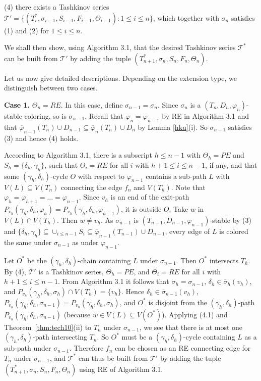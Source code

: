 \documentclass[11pt]{article}
\newcommand{\TT}{\mathcal {T}}
\newcommand{\phibar}{\overline{\varphi}}
\begin{document}
(4) there exists a Tashkinov series $\TT'=\{(T_i^*, \sigma_{i-1}, S_{i-1}, F_{i-1}, \Theta_{i-1}): 1\le i \le n\}$, which together with $\sigma_n$ satisfies 
(1) and (2) for $1\le i \le n$.

We shall then show, using Algorithm 3.1, that the desired Tashkinov series $\TT^*$ can be built from $\TT'$ by adding the tuple $(T^*_{n+1}, \sigma_{n}, S_{n}, F_{n}, \Theta_{n})$. 

Let us now give detailed descriptions. Depending on the extension type, we distinguish between two cases.

{\bf Case 1.} $\Theta_n=RE$. In this case, define $\sigma_{n-1}=\sigma_n$. Since $\sigma_n$ is a $(T_n,D_n,\varphi_n)$-stable coloring, so is $\sigma_{n-1}$. 
Recall that $\varphi_n=\varphi_{n-1}$ by RE in Algorithm 3.1 and that $\phibar_{n-1}(T_n)\cup D_{n-1}\subseteq \phibar_{n}(T_n)\cup D_n$ by Lemma \ref{hku}(i).
So $\sigma_{n-1}$ satisfies (3) and hence (4) holds.

According to Algorithm 3.1, there is a subscript $h \le n-1$ with $\Theta_h=PE$ and $S_h=\{\delta_h, \gamma_h\}$, such that $\Theta_i=RE$ for all $i$ 
with $h+1\le i \le n-1$, if any, and that some $(\gamma_h,\delta_h)$-cycle $O$ with respect to $\varphi_{n-1}$ contains a sub-path $L$ 
with $V(L)\subseteq V(T_n)$ connecting the edge $f_n$ and $V(T_h)$. Note that $\varphi_h=\varphi_{h+1}= \ldots =\varphi_{n-1}$.  
Since $v_h$ is an end of the exit-path $P_{v_h}(\gamma_h,\delta_h,\varphi_h)=P_{v_h}(\gamma_h,\delta_h,
\varphi_{n-1})$, it is outside $O$. Take $w$ in $V(L)\cap V(T_h)$. Then $w\neq v_h$.
As $\sigma_{n-1}$ is $(T_{n-1},D_{n-1},\varphi_{n-1})$-stable by (3) and $\{\delta_h,\gamma_h\} \subseteq \cup_{i \le n-1} S_i \subseteq
\phibar_{n-1}(T_{n-1})\cup D_{n-1}$, every edge of $L$ is colored the same under $\sigma_{n-1}$ as under $\varphi_{n-1}$. 

Let $O^*$ be the $(\gamma_h,\delta_h)$-chain containing $L$ under $\sigma_{n-1}$. Then $O^*$ intersects $T_h$. By (4), $\TT'$ is a 
Tashkinov series, $\Theta_h=PE$, and $\Theta_i=RE$ for all $i$ with $h+1\le i \le n-1$. From Algorithm 3.1 it follows that 
$\sigma_h=\sigma_{n-1}$, $\delta_h\in\overline{\sigma}_h(v_h)$, and $P_{v_h}(\gamma_h,\delta_h,\sigma_h)\cap V(T_h)=\{v_h\}$.
Hence $\delta_h\in\overline{\sigma}_{n-1}(v_h)$, $P_{v_h}(\gamma_h,\delta_h,\sigma_{n-1})=P_{v_h}(\gamma_h,\delta_h,\sigma_h)$,
and $O^*$ is disjoint from the $(\gamma_h,\delta_h)$-path $P_{v_h}(\gamma_h,\delta_h,\sigma_{n-1})$ (because $w\in V(L)\subseteq V(O^*)$). Applying (4.1) and 
Theorem~\ref{thm:tech10}(ii) to $T_n$ under $\sigma_{n-1}$, we see that there is at most one $(\gamma_h,\delta_h)$-path 
intersecting $T_n$. So $O^*$ must be a $(\gamma_h,\delta_h)$-cycle containing $L$ as a sub-path under $\sigma_{n-1}$. 
Therefore $f_n$ can be chosen as an RE connecting edge for $T_n$ under $\sigma_{n-1}$, and $\TT^*$ can thus be built from $\TT'$ 
by adding the tuple $(T^*_{n+1}, \sigma_{n}, S_{n}, F_{n}, \Theta_{n})$ using RE of Algorithm 3.1.
\end{document}
